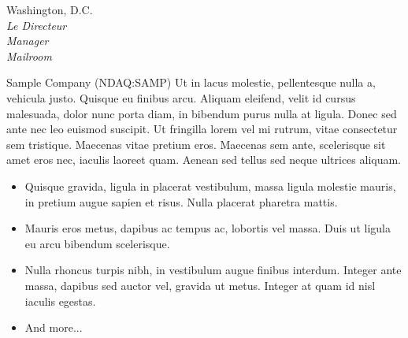 \documentclass[letterpaper,10pt,final]{memoir}
\begin{document}
{ \hfill Washington, D.C.\\
\vspace{0mm}
		\textit{\hspace{5mm} Le Directeur}\\
\vspace{0mm}
        \textit{\hspace{5mm} Manager}\\
\vspace{0mm}
        \textit{\hspace{5mm} Mailroom}\\
\par Sample Company (NDAQ:SAMP) Ut in lacus molestie, pellentesque nulla a, vehicula justo. Quisque eu finibus arcu. Aliquam eleifend, velit id cursus malesuada, dolor nunc porta diam, in bibendum purus nulla at ligula. Donec sed ante nec leo euismod suscipit. Ut fringilla lorem vel mi rutrum, vitae consectetur sem tristique. Maecenas vitae pretium eros. Maecenas sem ante, scelerisque sit amet eros nec, iaculis laoreet quam. Aenean sed tellus sed neque ultrices aliquam.
\begin{itemize}
\item Quisque gravida, ligula in placerat vestibulum, massa ligula molestie mauris, in pretium augue sapien et risus. Nulla placerat pharetra mattis.
\item Mauris eros metus, dapibus ac tempus ac, lobortis vel massa. Duis ut ligula eu arcu bibendum scelerisque.
\item Nulla rhoncus turpis nibh, in vestibulum augue finibus interdum. Integer ante massa, dapibus sed auctor vel, gravida ut metus. Integer at quam id nisl iaculis egestas.
\item And more...
\end{itemize}
\SmallSep

}
\end{document}
